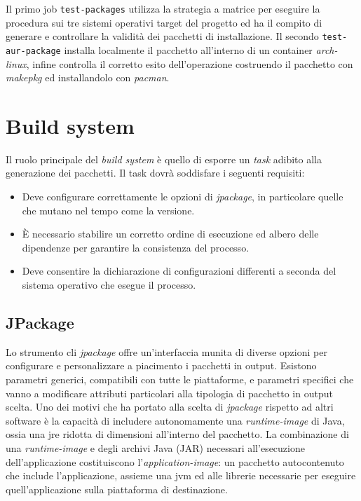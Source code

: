 Il primo job \texttt{test-packages} utilizza la strategia a matrice per eseguire la procedura sui tre sistemi operativi target del progetto ed ha il compito di generare e controllare la validità dei pacchetti di installazione. Il secondo \texttt{test-aur-package} installa localmente il pacchetto all'interno di un container \textit{arch-linux}, infine controlla il corretto esito dell'operazione costruendo il pacchetto con \textit{makepkg} ed installandolo con \textit{pacman}.

\section{Build system}

Il ruolo principale del \textit{build system} è quello di esporre un \textit{task} adibito alla generazione dei pacchetti. Il task dovrà soddisfare i seguenti requisiti:
\begin{itemize}
	\item Deve configurare correttamente le opzioni di \textit{jpackage}, in particolare quelle che mutano nel tempo come la versione.
	\item È necessario stabilire un corretto ordine di esecuzione ed albero delle dipendenze per garantire la consistenza del processo.
	\item Deve consentire la dichiarazione di configurazioni differenti a seconda del sistema operativo che esegue il processo.
\end{itemize}

\subsection{JPackage} Lo strumento \ac{cli} \textit{jpackage} offre un'interfaccia munita di diverse opzioni per configurare e personalizzare a piacimento i pacchetti in output. Esistono parametri generici, compatibili con tutte le piattaforme, e parametri specifici che vanno a modificare attributi particolari alla tipologia di pacchetto in output scelta. Uno dei motivi che ha portato alla scelta di \textit{jpackage} rispetto ad altri software è la capacità di includere autonomamente una \textit{runtime-image} di Java, ossia una \ac{jre} ridotta di dimensioni all'interno del pacchetto. La combinazione di una \textit{runtime-image} e degli archivi Java (JAR) necessari all'esecuzione dell'applicazione costituiscono l'\textit{application-image}: un pacchetto autocontenuto che include l'applicazione, assieme una \ac{jvm} ed alle librerie necessarie per eseguire quell'applicazione sulla piattaforma di destinazione.

